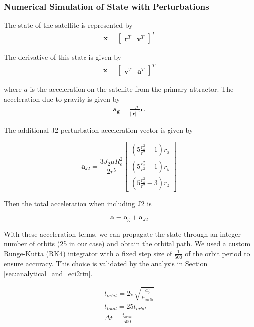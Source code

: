 \subsubsection{Numerical Simulation of State with Perturbations} \label{sec:fode_simulation}
The state of the satellite is represented by 
\begin{align}
    \boldsymbol{x} = \begin{bmatrix}
        \boldsymbol{r}^T & \boldsymbol{v}^T
    \end{bmatrix}^T
\end{align}

The derivative of this state is given by 
\begin{align}
    \boldsymbol{\dot{x}} = \begin{bmatrix}
        \boldsymbol{v}^T & \boldsymbol{a}^T
    \end{bmatrix}^T
\end{align}

where $a$ is the acceleration on the satellite from the primary attractor. The acceleration due to gravity is given by
\begin{align}
    \boldsymbol{a_g} = \frac{-\mu}{||\boldsymbol{r}||^3} \boldsymbol{r}.
\end{align}

The additional J2 perturbation acceleration vector is given by 

\[
\mathbf{a}_{J2} = \frac{3 J_2 \mu R_e^2}{2 r^5} \begin{bmatrix}
\left(5\frac{r_z^2}{r^2} - 1\right) r_x \\
\left(5\frac{r_z^2}{r^2} - 1\right) r_y \\
\left(5\frac{r_z^2}{r^2} - 3\right) r_z
\end{bmatrix}
\]

Then the total acceleration when including J2 is

\[
\mathbf{a} = \mathbf{a}_{\text{g}} + \mathbf{a}_{J2}
\]

With these acceleration terms, we can propagate the state through an integer number of orbits (25 in our case) and obtain the orbital path. We used a custom Runge-Kutta (RK4) integrator with a fixed step size of $\frac{1}{500}$ of the orbit period to ensure accuracy. This choice is validated by the analysis in Section \ref{sec:analytical_and_eci2rtn}.

\begin{align}
    t_{orbit} = 2\pi \sqrt{\frac{a_0^3}{\mu_{earth}}} \\
    t_{total} = 25t_{orbit} \\
    \Delta t = \frac{t_{orbit}}{500} \label{eq:timestep}%
\end{align}

